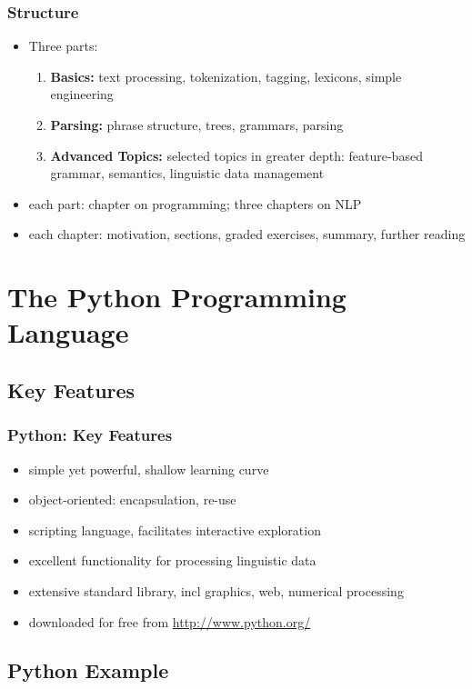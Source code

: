 \documentclass{beamer}             %
\begin{document}
\begin{frame}
  \frametitle{Structure}
  \begin{itemize}
    \item Three parts:
    \begin{enumerate}
      \item \textbf{Basics:} text processing, tokenization, tagging,
        lexicons, simple engineering
      \item \textbf{Parsing:} phrase structure, trees, grammars, parsing
      \item \textbf{Advanced Topics:} selected topics in greater depth:
        feature-based grammar, semantics, linguistic data management
    \end{enumerate}
    \item each part: chapter on programming; three chapters on NLP
    \item each chapter: motivation, sections, graded exercises, summary, further reading
  \end{itemize}
\end{frame}

\section{The Python Programming Language}

\subsection{Key Features}

\begin{frame}
  \frametitle{Python: Key Features}
  \begin{itemize}
    \item simple yet powerful, shallow learning curve
    \item object-oriented: encapsulation, re-use
    \item scripting language, facilitates interactive exploration
    \item excellent functionality for processing linguistic data
    \item extensive standard library, incl graphics, web, numerical processing
    \item downloaded for free from \url{http://www.python.org/}
  \end{itemize}
\end{frame}

\subsection{Python Example}
\end{document}
